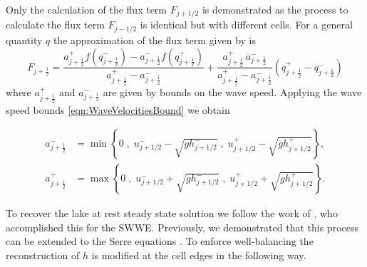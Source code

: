 \documentclass[times]{elsarticle}
\begin{document}
Only the calculation of the flux term $F_{j+1/2}$ is demonstrated as the process to calculate the flux term $F_{j-1/2}$ is identical but with different cells. For a general quantity $q$ the approximation of the flux term given by \citet{Kurganov-etal-2001-707} is
\begin{equation}\label{eqn:HLL_flux}
F_{j+\frac{1}{2}} = \dfrac{a^+_{j+\frac{1}{2}} f\left(q^-_{j+\frac{1}{2}}\right) - a^-_{j+\frac{1}{2}} f\left(q^+_{j+\frac{1}{2}}\right)}{a^+_{j+\frac{1}{2}} - a^-_{j+\frac{1}{2}}}  + \dfrac{a^+_{j+\frac{1}{2}} \, a^-_{j+\frac{1}{2}}}{a^+_{j+\frac{1}{2}} - a^-_{j+\frac{1}{2}}} \left(  q^+_{j+\frac{1}{2}} - q^-_{j+\frac{1}{2}} \right)
\end{equation}
where $a^+_{j+\frac{1}{2}}$ and $a^-_{j+\frac{1}{2}}$ are given by bounds on the wave speed. Applying the wave speed bounds \eqref{eqn:WaveVelocitiesBound} we obtain

\begin{align}
a^-_{j+\frac{1}{2}} &= \min\left\lbrace 0\;,\;  u^-_{j + 1/2} - \sqrt{g h^-_{j + 1/2}}  \;,\;u^+_{j + 1/2} - \sqrt{g h^+_{j + 1/2}} \right\rbrace  ,\\
a^+_{j+\frac{1}{2}} &= \max\left\lbrace 0 \;,\;  u^-_{j + 1/2} + \sqrt{g h^-_{j + 1/2}}  \;,\;u^+_{j + 1/2} + \sqrt{g h^+_{j + 1/2}} \right\rbrace .
\label{eqn:WaveSpeedBoundsFluxApprox}
\end{align}

To recover the lake at rest steady state solution we follow the work of \citet{Klein-etal-2004-2050}, who accomplished this for the SWWE. Previously, we demonstrated that this process can be extended to the Serre equations \cite{Pitt-J-2014}. To enforce well-balancing the reconstruction of $h$ is modified at the cell edges in the following way.
\end{document}
